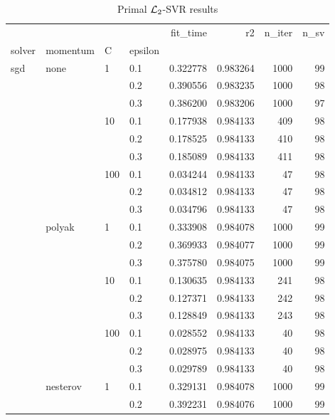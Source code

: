 \begin{table}[H]
\centering
\caption{Primal $\protect \mathcal{L}_2$-SVR results}
\label{primal_l2_svr_cv_results}
\begin{tabular}{llllrrrr}
\toprule
          &   &     &     &  fit\_time &        r2 &  n\_iter &  n\_sv \\
solver & momentum & C & epsilon &           &           &         &       \\
\midrule
sgd & none & 1   & 0.1 &  0.322778 &  0.983264 &    1000 &    99 \\
          &   &     & 0.2 &  0.390556 &  0.983235 &    1000 &    98 \\
          &   &     & 0.3 &  0.386200 &  0.983206 &    1000 &    97 \\
          &   & 10  & 0.1 &  0.177938 &  0.984133 &     409 &    98 \\
          &   &     & 0.2 &  0.178525 &  0.984133 &     410 &    98 \\
          &   &     & 0.3 &  0.185089 &  0.984133 &     411 &    98 \\
          &   & 100 & 0.1 &  0.034244 &  0.984133 &      47 &    98 \\
          &   &     & 0.2 &  0.034812 &  0.984133 &      47 &    98 \\
          &   &     & 0.3 &  0.034796 &  0.984133 &      47 &    98 \\
          & polyak & 1   & 0.1 &  0.333908 &  0.984078 &    1000 &    99 \\
          &   &     & 0.2 &  0.369933 &  0.984077 &    1000 &    99 \\
          &   &     & 0.3 &  0.375780 &  0.984075 &    1000 &    99 \\
          &   & 10  & 0.1 &  0.130635 &  0.984133 &     241 &    98 \\
          &   &     & 0.2 &  0.127371 &  0.984133 &     242 &    98 \\
          &   &     & 0.3 &  0.128849 &  0.984133 &     243 &    98 \\
          &   & 100 & 0.1 &  0.028552 &  0.984133 &      40 &    98 \\
          &   &     & 0.2 &  0.028975 &  0.984133 &      40 &    98 \\
          &   &     & 0.3 &  0.029789 &  0.984133 &      40 &    98 \\
          & nesterov & 1   & 0.1 &  0.329131 &  0.984078 &    1000 &    99 \\
          &   &     & 0.2 &  0.392231 &  0.984076 &    1000 &    99 \\

\end{tabular}
\end{table}
